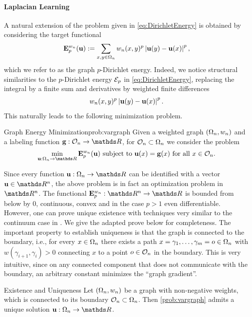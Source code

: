 \paragraph{Laplacian Learning} A natural extension of the problem given in \cref{eq:DirichletEnergy} is obtained by considering the target functional
%
\begin{align*}
	\mathbf{E}^{w_n}_p(\mathbf{u}):= \sum_{x,y\in\Omega_n} w_n(x,y)^p \left|\mathbf{u}(y) - \mathbf{u}(x)\right|^p,
\end{align*}
%
which we refer to as the graph $p$-Dirichlet energy. Indeed, we notice structural 
similarities to the $p$-Dirichlet energy $\mathcal{E}_p$ in \cref{eq:DirichletEnergy}, replacing the integral by a finite 
sum and derivatives by weighted finite differences
%
\begin{align*}
	w_n(x,y)^p \left|\mathbf{u}(y) - \mathbf{u}(x)\right|^p.
\end{align*}
%
This naturally leads to the following minimization problem.
%
\begin{problem}{Graph Energy Minimization}{prob:vargraph}
Given a weighted graph $(\Omega_n, w_n)$ and a labeling function $\vec g:\conset_n\to\R$, for $\mathcal{O}_n\subset\Omega_n$ we consider 
the problem
%
\begin{align*}
	\min_{\vec u:\domain_n\to\R} \GE^{w_n}_p(\vec u) \text{ subject to } \vec u(x) = \vec g(x) \text{ for all } x\in\conset_n.
\end{align*}
\end{problem}
%
\noindent%
Since every function $\vec u:\domain_n\to\R$ can be identified with a vector $\vec u\in\R^n$, the above problem 
is in fact an optimization problem in $\R^n$. The functional $\GE^{w_n}_p:\R^n\to\R$ is bounded from below by $0$, continuous, convex and in the case $p>1$ even differentiable. However, one can prove unique existence with techniques very similar to the continuum case in \cite{lindqvist2017notes}. We give the adapted prove below for completeness. The important property to establish uniqueness is that the graph is connected to the boundary, i.e., for every $x\in\Omega_n$ there exists a path $x=\gamma_1,\ldots,\gamma_m=o\in\Omega_n$ with $w(\gamma_{i+1}, \gamma_i)>0$ connecting $x$ to a point $o\in\mathcal{O}_n$ in the boundary. This is very intuitive, since on any connected component that does not communicate with the boundary, an arbitrary constant minimizes the \enquote{graph gradient}.
%
%
\begin{theorem}{Existence and Uniqueness}{} Let $(\Omega_n,w_n)$ 
	be a graph with non-negative weights, which is connected to its boundary $\mathcal{O}_n\subset\Omega_n$. 
	Then \cref{prob:vargraph} admits a unique solution $\vec u:\domain_n\to\R$.
\end{theorem}
